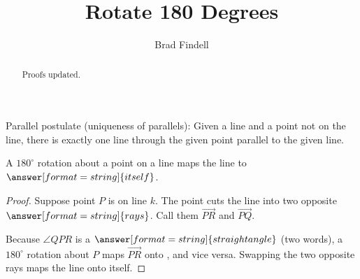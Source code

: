 \documentclass[nooutcomes]{ximera}
\title{Rotate 180 Degrees}
\author{Brad Findell}
\begin{document}
\begin{abstract}
Proofs updated. 
\end{abstract}
\maketitle


\begin{axiom}
Parallel postulate (uniqueness of parallels):  Given a line and a point not on the line, there is exactly one line through the given point parallel to the given line.  
\end{axiom}

\begin{problem}

\begin{theorem}
A $180^\circ$ rotation about a point on a line maps the line to 
$\answer[format=string]{itself}$. 
\end{theorem}

\begin{proof}
Suppose point $P$ is on line $k$.  The point cuts the line into two opposite $\answer[format=string]{rays}$.  Call them $\overrightarrow{PR}$ and $\overrightarrow{PQ}$.  
\begin{image}
\end{image}

Because $\angle QPR$ is a $\answer[format=string]{straight angle}$ (two words), a $180^\circ$ rotation about $P$ maps $\overrightarrow{PR}$ onto , and vice versa.  Swapping the two opposite rays maps the line onto itself.  
\end{proof}
\end{problem}
\end{document}
